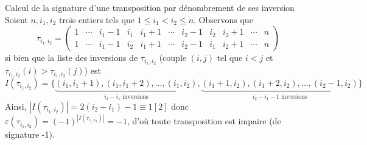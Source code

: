 \documentclass{article}
\date{12 janvier 2024}
\begin{document}
\maketitle

\begin{question_kholle}{Calcul de la signature d’une transposition par dénombrement de ses inversion}
	Soient $n, i_{1}, i_{2}$ trois entiers tels que $1\leq i_{1}<i_{2}\leq n$. Observons que
	\[
		\tau_{i_{1}, i_{2}} = \left(\begin{array}{ccccccccccc}
				1 & \cdots & i_{1}-1 & i_{1} & i_{1}+1 & \cdots & i_{2}-1 & i_{2} & i_{2}+1 & \cdots & n \\
				1 & \cdots & i_{1}-1 & i_{2} & i_{1}+1 & \cdots & i_{2}-1 & i_{1} & i_{2}+1 & \cdots & n
			\end{array}\right)
	\]
	si bien que la liste des inversions de $\tau_{i_{1}, i_{2}}$ (couple $(i,j)$ tel que $i<j$ et $\tau_{i_{1}, i_{2}}(i)>\tau_{i_{1}, i_{2}}(j)$) est
	\[
		I(\tau_{i_{1}, i_{2}})=\{\underbrace{(i_{1}, i_{1}+1),(i_{1}, i_{1}+2), \dots, (i_{1}, i_{2})}_{\text{$i_{2}-i_{1}$ inversions}}, \underbrace{(i_{1}+1, i_{2}), (i_{1}+2, i_{2}), \dots, (i_{2}-1, i_{2})}_{\text{$i_{2}-i_{1}-1$ inversions}}\}
	\]
	Ainsi, $|I(\tau_{i_{1}, i_{2}})| = 2(i_{2}-i_{1})-1 \equiv 1[2]$ donc $\varepsilon(\tau_{i_{1}, i_{2}}) = (-1)^{|I(\tau_{i_{1}, i_{2}})|}=-1$, d’où toute transposition est impaire (de signature -1).
\end{question_kholle}
\end{document}
